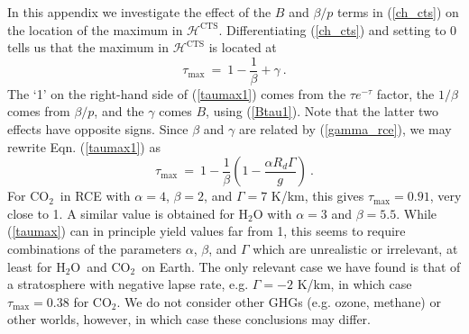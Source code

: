 \documentclass{ametsoc}
\newcommand{\beqn}{\begin{equation}}
\newcommand{\eeqn}{\end{equation}}
\newcommand{\eqnref}[1]{(\ref{#1})}
\newcommand{\Rd}{\ensuremath{R_d}}
\newcommand{\cotwo}{\ensuremath{\mathrm{CO_2}}}
\newcommand{\htwo}{\ensuremath{\mathrm{H_2O}}}
\newcommand{\ch}{\ensuremath{\mathcal{H}}}
\newcommand{\taumax}{\ensuremath{\tau_{\mathrm{max}}}}
\newcommand{\CTS}{\ensuremath{\mathrm{CTS}}}
\begin{document}
\appendix[B]
\label{appendix_tau1}
In this appendix we investigate the effect of the $B$ and $\beta/p$ terms in \eqnref{ch_cts} on the location of the maximum in $\ch^{\CTS}$. Differentiating \eqnref{ch_cts} and setting to 0 tells us that the maximum in $\ch^{\CTS}$ is located at 
\beqn
	\taumax \ = \ 1 - \frac{1}{\beta}  + \gamma \ .
	\label{taumax1}
\eeqn
The `1' on the right-hand side of \eqnref{taumax1} comes from the $\tau e^{-\tau}$ factor, the $1/\beta$ comes from $\beta/p$, and the $\gamma$ comes $B$, using \eqnref{Btau1}. Note that the latter two effects have opposite signs. Since $\beta$ and $\gamma$ are related by \eqnref{gamma_rce}, we may rewrite Eqn. \eqnref{taumax1} as
\beqn
	\taumax \ = \ 1 - \frac{1}{\beta}\left(1-\frac{\alpha\Rd\Gamma}{g}\right) \ .
	\label{taumax}
\eeqn
 For \cotwo\ in RCE with $\alpha=4$, $\beta=2$, and $\Gamma=7$ K/km, this gives $\taumax = 0.91$, very close to 1. A similar value is obtained for $\htwo$ with $\alpha=3$ and $\beta=5.5$.  While \eqnref{taumax} can in principle yield values far from 1, this seems to require combinations of the parameters $\alpha$, $\beta$, and $\Gamma$ which are unrealistic or irrelevant, at least for \htwo\ and \cotwo\ on Earth. The only relevant case we have found is that of a stratosphere with negative lapse rate, e.g. $\Gamma=-2$ K/km, in which case $\taumax=0.38$ for \cotwo. We do not consider other GHGs (e.g. ozone, methane) or other worlds, however, in which case these conclusions  may differ. 


\end{document}
